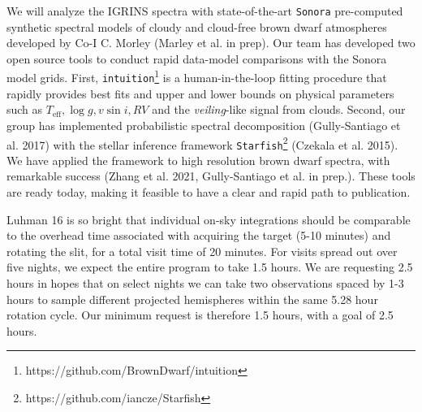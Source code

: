 \documentclass[11pt]{article}
\begin{document}
{We will analyze the IGRINS spectra with state-of-the-art \texttt{Sonora} pre-computed synthetic spectral models of cloudy and cloud-free brown dwarf atmospheres developed by Co-I C. Morley (Marley et al. in prep).  Our team has developed two open source tools to conduct rapid data-model comparisons with the Sonora model grids. First, \texttt{intuition}\footnote{https://github.com/BrownDwarf/intuition} is a human-in-the-loop fitting procedure that rapidly provides best fits and upper and lower bounds on physical parameters such as $T_{\mathrm{eff}}, \log{g}, v\sin{i}, RV$ and the \emph{veiling}-like signal from clouds.  Second, our group has implemented probabilistic spectral decomposition (Gully-Santiago et al. 2017) with the stellar inference framework \texttt{Starfish}\footnote{https://github.com/iancze/Starfish} (Czekala et al. 2015).  We have applied the framework to high resolution brown dwarf spectra, with remarkable success (Zhang et al. 2021, Gully-Santiago et al. in prep.).  These tools are ready today, making it feasible to have a clear and rapid path to publication.

Luhman 16 is so bright that individual on-sky integrations should be comparable to the overhead time  associated with acquiring the target (5-10 minutes) and rotating the slit, for a total visit time of 20 minutes.  For visits spread out over five nights, we expect the entire program to take 1.5 hours.  We are requesting 2.5 hours in hopes that on select nights we can take two observations spaced by 1-3 hours to sample different projected hemispheres within the same 5.28 hour rotation cycle.  Our minimum request is therefore 1.5 hours, with a goal of 2.5 hours.



%



}
\end{document}
